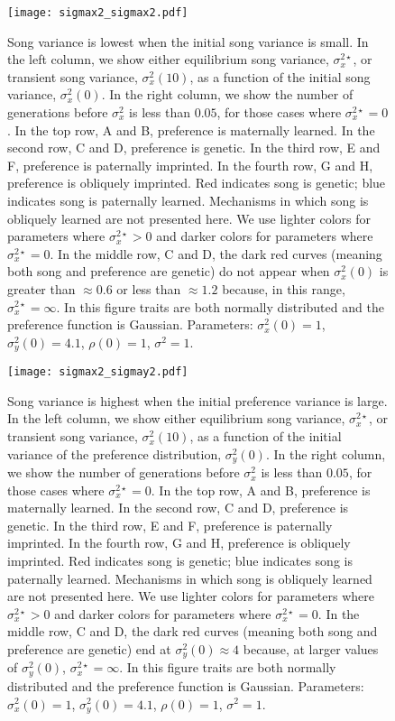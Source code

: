 \documentclass{article}
\begin{document}
\begin{figure}
\texttt{[image: sigmax2\_sigmax2.pdf]}
\caption{\label{sigmax2_sigmax2} Song variance is lowest when the initial song variance is small. In the left column, we show either equilibrium song variance, $\sigma_x^{2\star}$, or transient song variance, $\sigma_x^2(10)$, as a function of the initial song variance, $\sigma_x^2(0)$. In the right column, we show the number of generations before $\sigma_x^2$ is less than $0.05$, for those cases where $\sigma_x^{2\star}=0$. In the top row, A and B, preference is maternally learned. In the second row, C and D, preference is genetic. In the third row, E and F, preference is paternally imprinted. In the fourth row, G and H, preference is obliquely imprinted. Red indicates song is genetic; blue indicates song is paternally learned. Mechanisms in which song is obliquely learned are not presented here.  We use lighter colors for parameters where $\sigma_x^{2\star}>0$ and darker colors for parameters where $\sigma_x^{2\star}=0$. In the middle row, C and D, the dark red curves (meaning both song and preference are genetic) do not appear when $\sigma_x^2(0)$ is greater than $\approx 0.6$ or less than $\approx 1.2$ because, in this range, $\sigma_x^{2\star}=\infty$. In this figure traits are both normally distributed and the preference function is Gaussian. Parameters: $\sigma_x^2(0)=1$, $\sigma_y^2(0)=4.1$, $\rho(0)=1$, $\sigma^2=1$.    
} 
\end{figure}

\begin{figure}
\texttt{[image: sigmax2\_sigmay2.pdf]}
\caption{\label{sigmax2_sigmay2} Song variance is highest when the initial preference variance is large. In the left column, we show either equilibrium song variance, $\sigma_x^{2\star}$, or transient song variance, $\sigma_x^2(10)$, as a function of the initial variance of the preference distribution, $\sigma_y^2(0)$. In the right column, we show the number of generations before $\sigma_x^2$ is less than $0.05$, for those cases where $\sigma_x^{2\star}=0$. In the top row, A and B, preference is maternally learned. In the second row, C and D, preference is genetic. In the third row, E and F, preference is paternally imprinted. In the fourth row, G and H, preference is obliquely imprinted.  Red indicates song is genetic; blue indicates song is paternally learned. Mechanisms in which song is obliquely learned are not presented here.  We use lighter colors for parameters where $\sigma_x^{2\star}>0$ and darker colors for parameters where $\sigma_x^{2\star}=0$. In the middle row, C and D, the dark red curves (meaning both song and preference are genetic) end at $\sigma_y^2(0)\approx 4$ because, at larger values of $\sigma_y^2(0)$, $\sigma_x^{2\star}=\infty$. In this figure traits are both normally distributed and the preference function is Gaussian. Parameters: $\sigma_x^2(0)=1$, $\sigma_y^2(0)=4.1$, $\rho(0)=1$, $\sigma^2=1$. 
} 
\end{figure}
\end{document}
